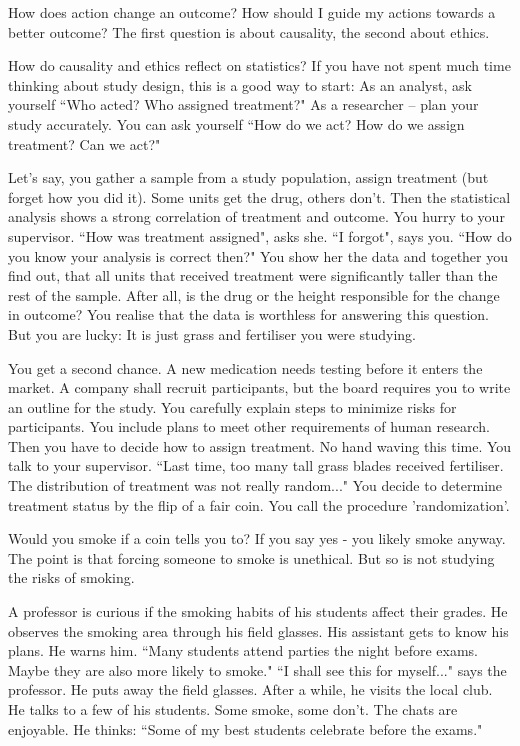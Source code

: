 How does action change an outcome?
How should I guide my actions towards a better outcome?
The first question is about causality, the second about ethics.

How do causality and ethics reflect on statistics?
If you have not spent much time thinking about study design, this is a good way to start: 
As an analyst, ask yourself “Who acted? Who assigned treatment?"
As a researcher -- plan your study accurately. You can ask yourself “How do we act? How do we assign treatment? Can we act?"

Let's say, you gather a sample from a study population, assign treatment (but forget how you did it). Some units get the drug, others don't. Then the statistical analysis shows a strong correlation of treatment and outcome. You hurry to your supervisor. “How was treatment assigned", asks she. “I forgot", says you.
“How do you know your analysis is correct then?"
You show her the data and together you find out, that all units that received treatment were significantly taller than the rest of the sample.
After all, is the drug or the height responsible for the change  in outcome?
You realise that the data is worthless for answering this question.
But you are lucky: It is just grass and fertiliser you were studying.

You get a second chance. A new medication needs testing before it enters the market. 
A company shall recruit participants, but the board requires you to write an outline for the study.
You carefully  explain steps to minimize risks for participants. You include plans to meet other requirements of human research.
Then you have to decide how to assign treatment.
No hand waving this time. You talk to your supervisor.
“Last time, too many tall grass blades received fertiliser. The distribution of treatment was not really random..."
You decide to determine treatment status by the flip of a fair coin.
You call the procedure 'randomization'.

Would you smoke if a coin tells you to? If you say yes - you likely smoke anyway. The point is that forcing someone to smoke is unethical. But so is not studying the risks of smoking.

A professor is curious if the smoking habits of his students affect their grades. 
He observes the smoking area through his field glasses.
His assistant gets to know his plans. He warns him. “Many students attend parties the night before exams. Maybe they are also more likely to smoke." “I shall see this for myself..." says the professor. He puts away the field glasses. After a while, he visits the local club.
He talks to a few of his students. Some smoke, some don't. The chats are enjoyable. He thinks: “Some of my best students celebrate before the exams."


